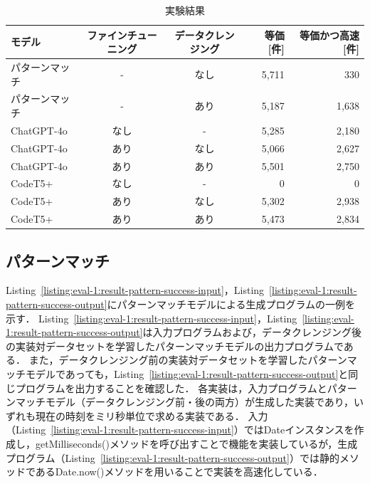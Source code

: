 \documentclass[11pt]{jreport}
\begin{document}
\begin{table}[t]
\caption{実験結果}
\label{table:eval-1:result-test-fast}
\centering
\begin{tabular}{lcc|rr}
\hline
モデル & ファインチューニング & データクレンジング & 等価 [件] & 等価かつ高速 [件] \\
\hline
パターンマッチ & - & なし & 5,711 & 330 \\ %
パターンマッチ & - & あり & 5,187 & 1,638 \\ %
ChatGPT-4o & なし & - & 5,285 & 2,180 \\ %
ChatGPT-4o & あり & なし & 5,066 & 2,627 \\ %
ChatGPT-4o & あり & あり & 5,501 & 2,750 \\ %
CodeT5+ & なし & - & 0 & 0 \\ %
CodeT5+ & あり & なし & 5,302 & 2,938 \\ %
CodeT5+ & あり & あり & 5,473 & 2,834 \\ %
\hline
\end{tabular}
\end{table}




\subsection{パターンマッチ}


Listing~\ref{listing:eval-1:result-pattern-success-input}，Listing~\ref{listing:eval-1:result-pattern-success-output}にパターンマッチモデルによる生成プログラムの一例を示す．
Listing~\ref{listing:eval-1:result-pattern-success-input}，Listing~\ref{listing:eval-1:result-pattern-success-output}は入力プログラムおよび，データクレンジング後の実装対データセットを学習したパターンマッチモデルの出力プログラムである．
また，データクレンジング前の実装対データセットを学習したパターンマッチモデルであっても，Listing~\ref{listing:eval-1:result-pattern-success-output}と同じプログラムを出力することを確認した．
各実装は，入力プログラムとパターンマッチモデル（データクレンジング前・後の両方）が生成した実装であり，いずれも現在の時刻をミリ秒単位で求める実装である．
入力（Listing~\ref{listing:eval-1:result-pattern-success-input}）ではDateインスタンスを作成し，getMilliseconds()メソッドを呼び出すことで機能を実装しているが，生成プログラム（Listing~\ref{listing:eval-1:result-pattern-success-output}）では静的メソッドであるDate.now()メソッドを用いることで実装を高速化している．
\end{document}
